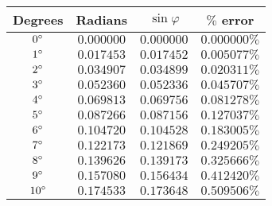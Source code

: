 \begin{tabular}{cccc} \toprule
Degrees       & Radians    & $\sin\varphi$ & $\%$ error   \\\midrule
${0}^{\circ}$  & $0.000000$ & $0.000000$    & $0.000000\%$ \\
${1}^{\circ}$  & $0.017453$ & $0.017452$    & $0.005077\%$ \\
${2}^{\circ}$  & $0.034907$ & $0.034899$    & $0.020311\%$ \\
${3}^{\circ}$  & $0.052360$ & $0.052336$    & $0.045707\%$ \\
${4}^{\circ}$  & $0.069813$ & $0.069756$    & $0.081278\%$ \\
${5}^{\circ}$  & $0.087266$ & $0.087156$    & $0.127037\%$ \\
${6}^{\circ}$  & $0.104720$ & $0.104528$    & $0.183005\%$ \\
${7}^{\circ}$  & $0.122173$ & $0.121869$    & $0.249205\%$ \\
${8}^{\circ}$  & $0.139626$ & $0.139173$    & $0.325666\%$ \\
${9}^{\circ}$  & $0.157080$ & $0.156434$    & $0.412420\%$ \\
${10}^{\circ}$ & $0.174533$ & $0.173648$    & $0.509506\%$ \\\bottomrule
\end{tabular}
